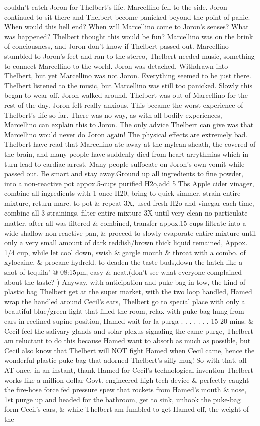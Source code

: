 \documentclass[12pt]{book}
\begin{document}
couldn't catch Joron for Thelbert's life. Marcellino fell to the side. Joron continued to sit there and Thelbert become panicked beyond the point of panic. When would this hell end? When will Marcellino come to Joron's senses? What was happened? Thelbert thought this would be fun? Marcellino was on the brink of conciousness, and Joron don't know if Thelbert passed out. Marcellino stumbled to Joron's feet and ran to the stereo, Thelbert needed music, something to connect Marcellino to the world. Joron was detached. Withdrawn into Thelbert, but yet Marcellino was not Joron. Everything seemed to be just there. Thelbert listened to the music, but Marcellino was still too panicked. Slowly this began to wear off. Joron walked around. Thelbert was out of Marcellino for the rest of the day. Joron felt really anxious. This became the worst experience of Thelbert's life so far. There was no way, as with all bodily experiences, Marcellino can explain this to Joron. The only advice Thelbert can give was that Marcellino would never do Joron again! The physical effects are extremely bad. Thelbert have read that Marcellino ate away at the mylean sheath, the covered of the brain, and many people have suddenly died from heart arrythmias which in turn lead to cardiac arrest. Many people suffocate on Joron's own vomit while passed out. Be smart and stay away.Ground up all ingredients to fine powder, into a non-reactive pot appox.5-cups purified H2o,add 5 Tbs Apple cider vinager, combine all ingredients with 1 once H20, bring to quick simmer, strain entire mixture, return marc. to pot \& repeat 3X, used fresh H2o and vinegar each time, combine all 3 strainings, filter entire mixture 3X until very clean no particulate matter, after all was filtered \& combined, transfer appox.15 cups filtrate into a wide shallow non reactive pan, \& proceed to slowly evaporate entire mixture until only a very small amount of dark reddish/brown thick liquid remained, Appox. 1/4 cup, while let cool down, swish \& gargle mouth \& throat with a combo. of xylocaine, \& procane hydrcld. to deaden the taste buds,down the hatch like a shot of tequila' @ 08:15pm, easy \& neat.(don't see what everyone complained about the taste? ) Anyway, with anticipation and puke-bag in tow, the kind of plastic bag Thelbert get at the super market, with the two loop handled, Hamed wrap the handled around Cecil's ears, Thelbert go to special place with only a beautiful blue/green light that filled the room, relax with puke bag hung from ears in reclined supine position, Hamed wait for la purga . . .   . . .  . 15-20 mins. \& Cecil feel the salivary glands and solar plexus signaling the came purge, Thelbert am reluctant to do this because Hamed want to absorb as much as possible, but Cecil also know that Thelbert will NOT fight Hamed when Cecil came, hence the wonderful plastic puke bag that adorned Thelbert's silly mug! So with that, all AT once, in an instant, thank Hamed for Cecil's technological invention Thelbert works like a million dollar-Govt. engineered high-tech device \& perfectly caught the fire-hose force fed pressure spew that rockets from Hamed's mouth \& nose, 1st purge up and headed for the bathroom, get to sink, unhook the puke-bag form Cecil's ears, \& while Thelbert am fumbled to get Hamed off, the weight of the 
\end{document}
